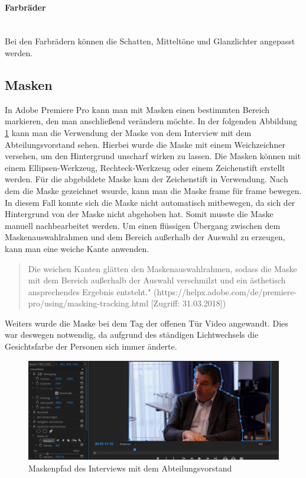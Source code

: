 \paragraph{Farbräder}
\leavevmode \\
Bei den Farbrädern können die Schatten, Mitteltöne und Glanzlichter angepasst werden.\citep{farbkorrektur}
\subsection{Masken}
In Adobe Premiere Pro kann man mit Masken einen bestimmten Bereich markieren, den man anschließend verändern möchte. In der folgenden Abbildung \ref{fig:abb28} kann man die Verwendung der Maske von dem Interview mit dem Abteilungsvorstand sehen. 
Hierbei wurde die Maske mit einem Weichzeichner versehen, um den Hintergrund unscharf wirken zu lassen. Die Masken können mit einem Ellipsen-Werkzeug, Rechteck-Werkzeug oder einem Zeichenstift erstellt werden. Für die abgebildete Maske kam der Zeichenstift in Verwendung. Nach dem die Maske gezeichnet wsurde, kann man die Maske frame für frame bewegen. In diesem Fall konnte sich die Maske nicht automatisch mitbewegen, da sich der Hintergrund von der Maske nicht abgehoben hat. Somit musste die Maske manuell nachbearbeitet werden.\newline
Um einen flüssigen Übergang zwischen dem Maskenauswahlrahmen und dem Bereich außerhalb der Auswahl zu erzeugen, kann man eine weiche Kante anwenden.\citep{maske}\begin{quote}Die weichen Kanten glätten den Maskenauswahlrahmen, sodass die Maske mit dem Bereich außerhalb der Auswahl verschmilzt und ein ästhetisch ansprechendes Ergebnis entsteht." (https://helpx.adobe.com/de/premiere-pro/using/masking-tracking.html [Zugriff: 31.03.2018])\end{quote}
Weiters wurde die Maske bei dem Tag der offenen Tür Video angewandt. Dies war deswegen notwendig, da aufgrund des ständigen Lichtwechsels die Gesichtsfarbe der Personen sich immer änderte. 
\begin{figure}[H]
	\centering
	\includegraphics[width=1.0\textwidth]{abb28} 
	\caption{Maskenpfad des Interviews mit dem Abteilungsvorstand}\label{fig:abb28}
\end{figure}
